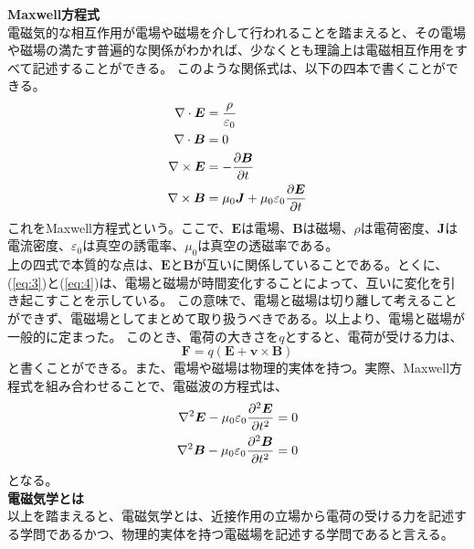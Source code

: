 \documentclass[a4paper,11pt]{jsarticle}
\numberwithin{equation}{section}
\begin{document}
\textbf{Maxwell方程式}\\
電磁気的な相互作用が電場や磁場を介して行われることを踏まえると、その電場や磁場の満たす普遍的な関係がわかれば、少なくとも理論上は電磁相互作用をすべて記述することができる。
このような関係式は、以下の四本で書くことができる。
\begin{align}
  \nabla \cdot \bm{E} &= \frac{\rho}{\varepsilon_0} \label{eq:1}\\
  \nabla \cdot \bm{B} &= 0 \label{eq:2}\\
  \nabla \times \bm{E} &= -\pdv{\bm{B}}{t} \label{eq:3}\\
  \nabla \times \bm{B} &= \mu_0 \bm{J} + \mu_0 \varepsilon_0 \pdv{\bm{E}}{t} \label{eq:4}
\end{align}
これをMaxwell方程式という。ここで、\(\bm{E}\)は電場、\(\bm{B}\)は磁場、\(\rho\)は電荷密度、\(\bm{J}\)は電流密度、\(\varepsilon_0\)は真空の誘電率、\(\mu_0\)は真空の透磁率である。\\
上の四式で本質的な点は、\(\bm{E}\)と\(\bm{B}\)が互いに関係していることである。とくに、(\ref{eq:3})と(\ref{eq:4})は、電場と磁場が時間変化することによって、互いに変化を引き起こすことを示している。
この意味で、電場と磁場は切り離して考えることができず、電磁場としてまとめて取り扱うべきである。以上より、電場と磁場が一般的に定まった。
このとき、電荷の大きさを$q$とすると、電荷が受ける力は、
\begin{equation}
  \bm{F} = q(\bm{E} + \bm{v} \times \bm{B})
\end{equation}
と書くことができる。また、電場や磁場は物理的実体を持つ。実際、Maxwell方程式を組み合わせることで、電磁波の方程式は、
\begin{align}
  \nabla^2 \bm{E} - \mu_0 \varepsilon_0 \pdv[2]{\bm{E}}{t} &= 0\\
  \nabla^2 \bm{B} - \mu_0 \varepsilon_0 \pdv[2]{\bm{B}}{t} &= 0
\end{align}
となる。\\

\textbf{電磁気学とは}\\
以上を踏まえると、電磁気学とは、近接作用の立場から電荷の受ける力を記述する学問であるかつ、物理的実体を持つ電磁場を記述する学問であると言える。\\
\end{document}
